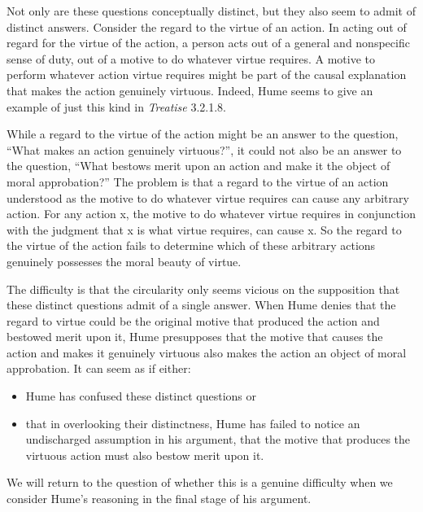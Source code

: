 Not only are these questions conceptually distinct, but they also seem to admit of distinct answers. Consider the regard to the virtue of an action. In acting out of regard for the virtue of the action, a person acts out of a general and nonspecific sense of duty, out of a motive to do whatever virtue requires. A motive to perform whatever action virtue requires might be part of the causal explanation that makes the action genuinely virtuous. Indeed, Hume seems to give an example of just this kind in \emph{Treatise} 3.2.1.8.

While a regard to the virtue of the action might be an answer to the question, ``What makes an action genuinely virtuous?'', it could not also be an answer to the question, ``What bestows merit upon an action and make it the object of moral approbation?'' The problem is that a regard to the virtue of an action understood as the motive to do whatever virtue requires can cause any arbitrary action. For any action x, the motive to do whatever virtue requires in conjunction with the judgment that x is what virtue requires, can cause x. So the regard to the virtue of the action fails to determine which of these arbitrary actions genuinely possesses the moral beauty of virtue.

The difficulty is that the circularity only seems vicious on the supposition that these distinct questions admit of a single answer. When Hume denies that the regard to virtue could be the original motive that produced the action and bestowed merit upon it, Hume presupposes that the motive that causes the action and makes it genuinely virtuous also makes the action an object of moral approbation. It can seem as if either:
\begin{itemize}
    \item Hume has confused these distinct questions or 
    \item that in overlooking their distinctness, Hume has failed to notice an undischarged assumption in his argument, that the motive that produces the virtuous action must also bestow merit upon it.
\end{itemize}

We will return to the question of whether this is a genuine difficulty when we consider Hume’s reasoning in the final stage of his argument. \change

% 

